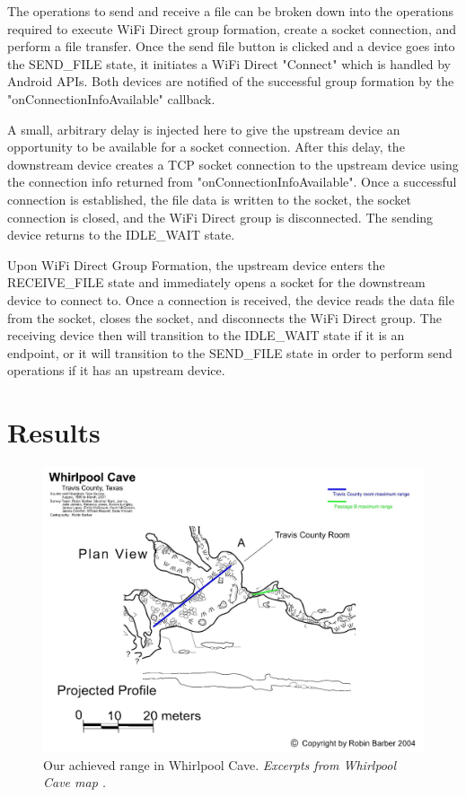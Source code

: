 \documentclass[10pt,twocolumn]{article}
\begin{document}
The operations to send and receive a file can be broken down into the operations required to execute WiFi Direct group formation, create a socket connection, and perform a file transfer. 
Once the send file button is clicked and a device goes into the SEND\_FILE state, it initiates a WiFi Direct "Connect" which is handled by Android APIs.
Both devices are notified of the successful group formation by the "onConnectionInfoAvailable" callback.

A small, arbitrary delay is injected here to give the upstream device an opportunity to be available for a socket connection.
After this delay, the downstream device creates a TCP socket connection to the upstream device using the connection info returned from "onConnectionInfoAvailable".
Once a successful connection is established, the file data is written to the socket, the socket connection is closed, and the WiFi Direct group is disconnected.
The sending device returns to the IDLE\_WAIT state.

Upon WiFi Direct Group Formation, the upstream device enters the RECEIVE\_FILE state and immediately opens a socket for the downstream device to connect to.
Once a connection is received, the device reads the data file from the socket, closes the socket, and disconnects the WiFi Direct group.
The receiving device then will transition to the IDLE\_WAIT state if it is an endpoint, or it will transition to the SEND\_FILE state in order to perform send operations if it has an upstream device.


\section{Results}

\begin{figure}[t]
\includegraphics[width=\textwidth]{our_whirlpool_experiments}
\caption{Our achieved range in Whirlpool Cave. \textit{Excerpts from Whirlpool Cave map \cite{wp_map}.}}
\label{fig:whirlpool_map}
\end{figure}
\end{document}
